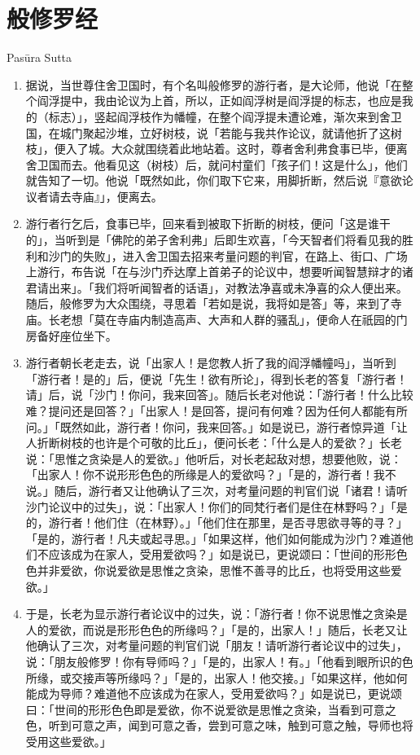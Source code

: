 \section{般修罗经}

\begin{center}Pasūra Sutta\end{center}\vspace{1em}

\begin{enumerate}\item 据说，当世尊住舍卫国时，有个名叫般修罗的游行者，是大论师，他说「在整个阎浮提中，我由论议为上首，所以，正如阎浮树是阎浮提的标志，也应是我的（标志）」，竖起阎浮枝作为幡幢，在整个阎浮提未遭论难，渐次来到舍卫国，在城门聚起沙堆，立好树枝，说「若能与我共作论议，就请他折了这树枝」，便入了城。大众就围绕着此地站着。这时，尊者舍利弗食事已毕，便离舍卫国而去。他看见这（树枝）后，就问村童们「孩子们！这是什么」，他们就告知了一切。他说「既然如此，你们取下它来，用脚折断，然后说『意欲论议者请去寺庙』」，便离去。
\item 游行者行乞后，食事已毕，回来看到被取下折断的树枝，便问「这是谁干的」，当听到是「佛陀的弟子舍利弗」后即生欢喜，「今天智者们将看见我的胜利和沙门的失败」，进入舍卫国去招来考量问题的判官，在路上、街口、广场上游行，布告说「在与沙门乔达摩上首弟子的论议中，想要听闻智慧辩才的诸君请出来」。「我们将听闻智者的话语」，对教法净喜或未净喜的众人便出来。随后，般修罗为大众围绕，寻思着「若如是说，我将如是答」等，来到了寺庙。长老想「莫在寺庙内制造高声、大声和人群的骚乱」，便命人在祇园的门房备好座位坐下。
\item 游行者朝长老走去，说「出家人！是您教人折了我的阎浮幡幢吗」，当听到「游行者！是的」后，便说「先生！欲有所论」，得到长老的答复「游行者！请」后，说「沙门！你问，我来回答」。随后长老对他说：「游行者！什么比较难？提问还是回答？」「出家人！是回答，提问有何难？因为任何人都能有所问。」「既然如此，游行者！你问，我来回答。」如是说已，游行者惊异道「让人折断树枝的也许是个可敬的比丘」，便问长老：「什么是人的爱欲？」长老说：「思惟之贪染是人的爱欲。」他听后，对长老起敌对想，想要他败，说：「出家人！你不说形形色色的所缘是人的爱欲吗？」「是的，游行者！我不说。」随后，游行者又让他确认了三次，对考量问题的判官们说「诸君！请听沙门论议中的过失」，说：「出家人！你们的同梵行者们是住在林野吗？」「是的，游行者！他们住（在林野）。」「他们住在那里，是否寻思欲寻等的寻？」「是的，游行者！凡夫或起寻思。」「如果这样，他们如何能成为沙门？难道他们不应该成为在家人，受用爱欲吗？」如是说已，更说颂曰：「世间的形形色色并非爱欲，你说爱欲是思惟之贪染，思惟不善寻的比丘，也将受用这些爱欲。」
\item 于是，长老为显示游行者论议中的过失，说：「游行者！你不说思惟之贪染是人的爱欲，而说是形形色色的所缘吗？」「是的，出家人！」随后，长老又让他确认了三次，对考量问题的判官们说「朋友！请听游行者论议中的过失」，说：「朋友般修罗！你有导师吗？」「是的，出家人！有。」「他看到眼所识的色所缘，或交接声等所缘吗？」「是的，出家人！他交接。」「如果这样，他如何能成为导师？难道他不应该成为在家人，受用爱欲吗？」如是说已，更说颂曰：「世间的形形色色即是爱欲，你不说爱欲是思惟之贪染，当看到可意之色，听到可意之声，闻到可意之香，尝到可意之味，触到可意之触，导师也将受用这些爱欲。」

\end{enumerate}
